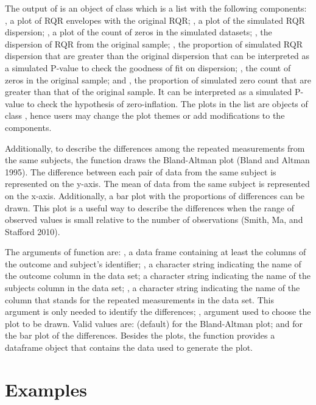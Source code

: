 The output of  is an object of class  which is a list with the following components: , a plot of RQR envelopes with the original RQR; , a plot of the simulated RQR dispersion; , a plot of the count of zeros in the simulated datasets; , the dispersion of RQR from the original sample; , the proportion of simulated RQR dispersion that are greater than the original dispersion that can be interpreted as a simulated P-value to check the goodness of fit on dispersion; , the count of zeros in the original sample; and , the proportion of simulated zero count that are greater than that of the original sample. It can be interpreted as a simulated P-value to check the hypothesis of zero-inflation. The plots in the list are objects of class , hence users may change the plot themes or add modifications to the components.

Additionally, to describe the differences among the repeated measurements from the same subjects, the function  draws the Bland-Altman plot (Bland and Altman 1995). The difference between each pair of data from the same subject is represented on the y-axis. The mean of data from the same subject is represented on the x-axis. Additionally, a bar plot with the proportions of differences can be drawn. This plot is a useful way to describe the differences when the range of observed values is small relative to the number of observations (Smith, Ma, and Stafford 2010).

The arguments of  function are: , a data frame containing at least the columns of the outcome and subject's identifier; , a character string indicating the name of the outcome column in the data set;  a character string indicating the name of the subjects column in the data set; , a character string indicating the name of the column that stands for the repeated measurements in the data set. This argument is only needed to identify the differences; , argument used to choose the plot to be drawn. Valid values are:  (default) for the Bland-Altman plot; and  for the bar plot of the differences. Besides the plots, the function provides a dataframe object that contains the data used to generate the plot.

\hypertarget{examples}{%
\section{Examples}\label{examples}}

